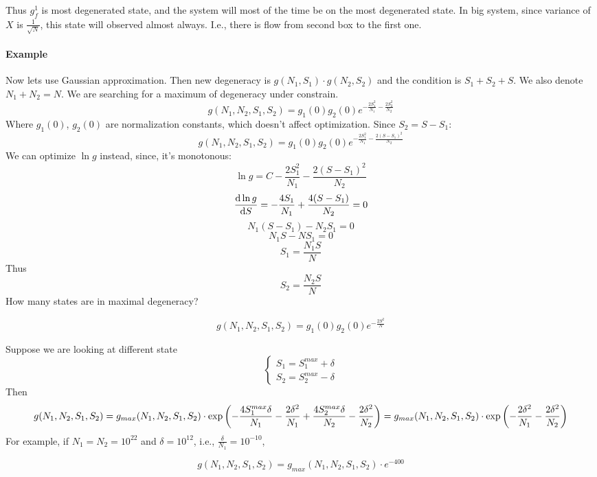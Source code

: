 Thus $g^1_f$ is most degenerated state, and the system will most of the time be on the most degenerated state. In big system, since variance of $X$ is $\frac{1}{\sqrt{N}}$, this state will observed almost always. I.e., there is flow from second box to the first one.

\paragraph{Example}
Now lets use Gaussian approximation. Then new degeneracy is
$g(N_1, S_1) \cdot g(N_2, S_2)$
and the condition is $S_1+S_2+S$. We also denote $N_1+N_2=N$. We are searching for a maximum of degeneracy under constrain.
$$g(N_1,N_2,S_1,S_2) = g_1(0)g_2(0) e^{-\frac{2S_1^2}{N_1}-\frac{2S_2^2}{N_2}}$$
Where $g_1(0)$, $g_2(0)$ are normalization constants, which doesn't affect optimization. Since $S_2 = S-S_1$:
$$g(N_1,N_2,S_1,S_2) = g_1(0)g_2(0) e^{-\frac{2S_1^2}{N_1}-\frac{2(S-S_1)^2}{N_2}}$$
We can optimize $\ln g$ instead, since, it's monotonous:
$$\ln g = C -\frac{2S_1^2}{N_1}-\frac{2(S-S_1)^2}{N_2} $$
$$\dv{\ln g}{S} =  -\frac{4S_1}{N_1}+\frac{4(S-S_1)}{N_2} = 0$$
$$N_1(S-S_1) - N_2 S_1= 0$$
$$N_1S - N S_1= 0$$
$$  S_1= \frac{N_1S}{N}$$
Thus
$$  S_2=  \frac{N_2S}{N}$$
How many states are in maximal degeneracy?

$$g(N_1,N_2,S_1,S_2) = g_1(0)g_2(0) e^{-\frac{2S^2}{N}}$$

Suppose we are looking at different state
$$\begin{cases}
S_1 = S_1^{max} + \delta\\
S_2 = S_2^{max} - \delta
\end{cases}$$
Then
\begin{align*}
g(N_1,N_2,S_1,S_2) = g_{max}(N_1,N_2,S_1,S_2) \cdot \exp\qty(-\frac{4S_1^{max} \delta}{N_1}-\frac{2\delta^2}{N_1}+\frac{4S_2^{max} \delta}{N_2}-\frac{2\delta^2}{N_2}) = g_{max}(N_1,N_2,S_1,S_2) \cdot \exp\qty(-\frac{2\delta^2}{N_1}-\frac{2\delta^2}{N_2})
\end{align*}
For example, if $N_1=N_2=10^{22}$  and $\delta = 10^{12}$, i.e., $\frac{\delta}{N_1} = 10^{-10}$, 

$$g(N_1,N_2,S_1,S_2) = g_{max}(N_1,N_2,S_1,S_2) \cdot e^{-400}$$